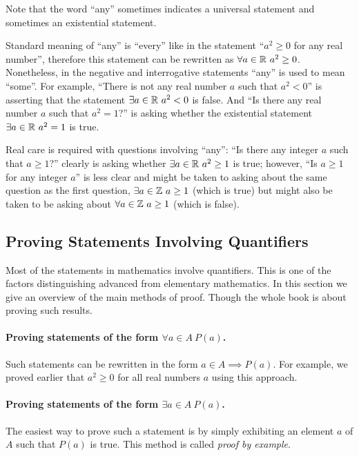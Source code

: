 \begin{warning}
  Note that the word ``any'' sometimes indicates a universal statement and
  sometimes an existential statement.

  Standard meaning of ``any'' is ``every'' like in the statement ``$a^2 \ge 0$
  for any real number'', therefore this statement can be rewritten as
  $\forall a \in \mathbb{R} \ a^2 \ge 0$. Nonetheless, in the negative and interrogative
  statements ``any'' is used to mean ``some''. For example, ``There is not any
  real number $a$ such that $a^2 < 0$'' is asserting that the statement
  $\exists a \in \mathbb{R} \ a^2 < 0$ is false. And ``Is there any real number $a$ such
  that $a^2 = 1$?'' is asking whether the existential statement
  $\exists a \in \mathbb{R} \ a^2 = 1$ is true.

  Real care is required with questions involving ``any'': ``Is there any
  integer $a$ such that $a \ge 1$?'' clearly is asking whether $\exists a \in
  \mathbb{R} \ a^2 \ge 1$ is true; however, ``Is $a \ge 1$ for any integer $a$'' is less
  clear and might be taken to asking about the same question as the first
  question, $\exists a \in \mathbb{Z} \ a \ge 1$ (which is true) but might also be
  taken to be asking about $\forall a \in \mathbb{Z} \ a \ge 1$ (which is false).
\end{warning}

\subsection{Proving Statements Involving Quantifiers}
Most of the statements in mathematics involve quantifiers. This is one of the
factors distinguishing advanced from elementary mathematics. In this section we
give an overview of the main methods of proof. Though the whole book is about
proving such results.

\paragraph{Proving statements of the form $\forall a \in A \ P(a)$.}
Such statements can be rewritten in the form $a \in A \implies P(a)$. For
example, we proved earlier that $a^2 \ge 0$ for all real numbers $a$ using this
approach.

\paragraph{Proving statements of the form $\exists a \in A \ P(a)$.}
The easiest way to prove such a statement is by simply exhibiting an element $a$
of $A$ such that $P(a)$ is true. This method is called \emph{proof by
example}.

